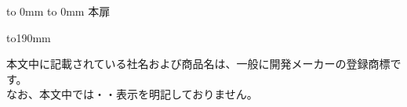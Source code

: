 \begin{comment}
%
%
\end{comment}

\thispagestyle{empty} \vbox to 0mm{\vspace*{-27.5truemm} \hbox to 0mm{
}\vss} 本扉 \pagebreak


\begin{comment}
%
%
\end{comment}

\thispagestyle{frontheadings}

\vbox to190mm{ \vfil
\begin{minipage}[b]{112mm}
%
\begin{spacing}{1.0}
\begin{small}
本文中に記載されている社名および商品名は、一般に開発メーカーの登録商標です。\\
なお、本文中では\texttrademark ・\textcopyright ・\textregistered 表示を明記しておりません。
\end{small}
\end{spacing}
\end{minipage}
}
